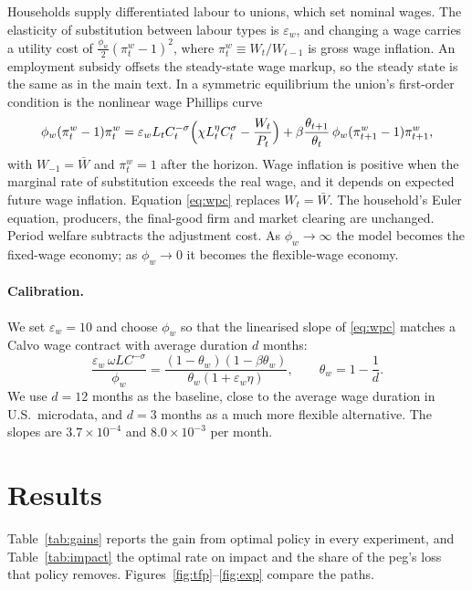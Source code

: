 \documentclass[11pt]{article}
\begin{document}
Households supply differentiated labour to unions, which set nominal wages. The elasticity of
substitution between labour types is $\varepsilon_w$, and changing a wage carries a utility cost of
$\frac{\phi_w}{2}(\pi^w_t-1)^2$, where $\pi^w_t\equiv W_t/W_{t-1}$ is gross wage inflation. An employment
subsidy offsets the steady-state wage markup, so the steady state is the same as in the main text. In
a symmetric equilibrium the union's first-order condition is the nonlinear wage Phillips curve
\begin{equation}\label{eq:wpc}
  \phi_w(\pi^w_t-1)\pi^w_t
  =\varepsilon_wL_tC_t^{-\sigma}\Bigl(\chi L_t^{\eta}C_t^{\sigma}-\frac{W_t}{P_t}\Bigr)
  +\beta\frac{\theta_{t+1}}{\theta_t}\,\phi_w(\pi^w_{t+1}-1)\pi^w_{t+1},
\end{equation}
with $W_{-1}=\bar W$ and $\pi^w_t=1$ after the horizon. Wage inflation is positive when the marginal rate
of substitution exceeds the real wage, and it depends on expected future wage inflation. Equation
\eqref{eq:wpc} replaces $W_t=\bar W$. The household's Euler equation, producers, the final-good firm and
market clearing are unchanged. Period welfare subtracts the adjustment cost. As $\phi_w\to\infty$ the
model becomes the fixed-wage economy; as $\phi_w\to0$ it becomes the flexible-wage economy.

\paragraph{Calibration.} We set $\varepsilon_w=10$ and choose $\phi_w$ so that the linearised slope of
\eqref{eq:wpc} matches a Calvo wage contract with average duration $d$ months:
\[
  \frac{\varepsilon_w\,\omega L C^{-\sigma}}{\phi_w}=\frac{(1-\theta_w)(1-\beta\theta_w)}{\theta_w(1+\varepsilon_w\eta)},
  \qquad \theta_w=1-\frac1d .
\]
We use $d=12$ months as the baseline, close to the average wage duration in U.S.\ microdata, and
$d=3$ months as a much more flexible alternative. The slopes are $3.7\times10^{-4}$ and
$8.0\times10^{-3}$ per month.

\section{Results}

Table~\ref{tab:gains} reports the gain from optimal policy in every experiment, and
Table~\ref{tab:impact} the optimal rate on impact and the share of the peg's loss that policy removes.
Figures~\ref{fig:tfp}--\ref{fig:exp} compare the paths.
\end{document}
